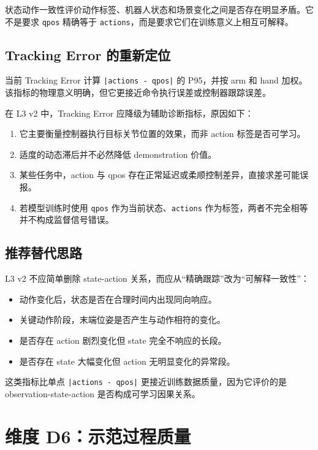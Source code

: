 \documentclass[UTF8,zihao=-4,oneside,openany]{ctexrep}
\begin{document}
状态动作一致性评价动作标签、机器人状态和场景变化之间是否存在明显矛盾。它不是要求 \texttt{qpos} 精确等于 \texttt{actions}，而是要求它们在训练意义上相互可解释。

\subsection{Tracking Error 的重新定位}

当前 Tracking Error 计算 \texttt{|actions - qpos|} 的 P95，并按 arm 和 hand 加权。该指标的物理意义明确，但它更接近命令执行误差或控制器跟踪误差。

在 L3 v2 中，Tracking Error 应降级为辅助诊断指标，原因如下：

\begin{enumerate}
  \item 它主要衡量控制器执行目标关节位置的效果，而非 action 标签是否可学习。
  \item 适度的动态滞后并不必然降低 demonstration 价值。
  \item 某些任务中，action 与 qpos 存在正常延迟或柔顺控制差异，直接求差可能误报。
  \item 若模型训练时使用 \texttt{qpos} 作为当前状态、\texttt{actions} 作为标签，两者不完全相等并不构成监督信号错误。
\end{enumerate}

\subsection{推荐替代思路}

L3 v2 不应简单删除 state-action 关系，而应从“精确跟踪”改为“可解释一致性”：

\begin{itemize}
  \item 动作变化后，状态是否在合理时间内出现同向响应。
  \item 关键动作阶段，末端位姿是否产生与动作相符的变化。
  \item 是否存在 action 剧烈变化但 state 完全不响应的长段。
  \item 是否存在 state 大幅变化但 action 无明显变化的异常段。
\end{itemize}

这类指标比单点 \texttt{|actions - qpos|} 更接近训练数据质量，因为它评价的是 observation-state-action 是否构成可学习因果关系。

\section{维度 D6：示范过程质量}
\end{document}
